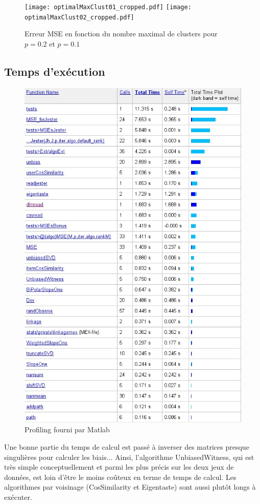 \documentclass[11pt, openany, a4paper]{article}
\begin{document}
		\begin{figure}[ht]
			\centering
			\texttt{[image: optimalMaxClust01\_cropped.pdf]}
			\texttt{[image: optimalMaxClust02\_cropped.pdf]}
			\caption{Erreur MSE en fonction du nombre maximal de clusters pour $p=0.2$ et $p=0.1$}
			\label{clusterfig}
		\end{figure}
		
	\subsection{Temps d'exécution}
	
		\begin{figure}[ht!]
			\centering
			\includegraphics[width=0.9\linewidth]{times.jpg}
			\caption{Profiling fourni par Matlab}
		\end{figure}
		

		Une bonne partie du temps de calcul est passé à inverser des matrices presque singulières pour calculer les biais... Ainsi, l'algorithme UnbiasedWitness, qui est très simple conceptuellement et parmi les plus précis sur les deux jeux de données, est loin d'être le moins coûteux en terme de temps de calcul.
		Les algorithmes par voisinage (CosSimilarity et Eigentaste) sont aussi plutôt longs à exécuter.
				
\end{document}
